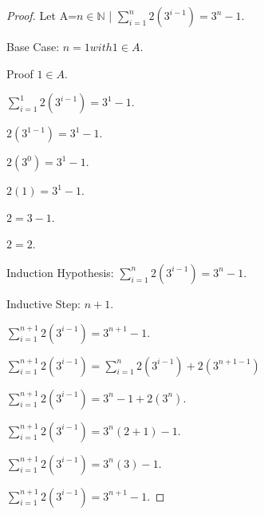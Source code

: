 \documentclass{article}
\begin{document}
\begin{proof}
    \item Let A={$n \in \mathbb{N}$ | $\sum_{i=1}^{n} 2(3^{i-1}) = 3^n - 1$}.
    \item Base Case: $n = 1 with 1 \in A$.
    \item Proof $1 \in A$.
    \item $\sum_{i=1}^{1} 2(3^{i-1}) = 3^1 - 1$.
    \item $2(3^{1-1}) = 3^1 - 1$.
    \item $2(3^0) = 3^1 - 1$.
    \item $2(1) = 3^1 - 1$.
    \item $2 = 3 - 1$.
    \item $2 = 2$.
    \item Induction Hypothesis: $\sum_{i=1}^{n} 2(3^{i-1}) = 3^n - 1$.
    \item Inductive Step: $n+1$.
    \item $\sum_{i=1}^{n+1} 2(3^{i-1}) = 3^{n+1} - 1$.
    \item $\sum_{i=1}^{n+1} 2(3^{i-1}) = \sum_{i=1}^{n} 2(3^{i-1}) + 2(3^{n+1-1})$ 
    \item $\sum_{i=1}^{n+1} 2(3^{i-1}) = 3^n - 1 + 2(3^{n})$.
    \item $\sum_{i=1}^{n+1} 2(3^{i-1}) = 3^n (2+1) - 1$.
    \item $\sum_{i=1}^{n+1} 2(3^{i-1}) = 3^n (3) - 1$.
    \item $\sum_{i=1}^{n+1} 2(3^{i-1}) = 3^{n+1} - 1$.

    \end{proof}
     

    
\end{document}
